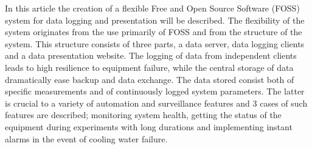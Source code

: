 In this article the creation of a flexible Free and Open Source
Software (FOSS) system for data logging and presentation will be
described. The flexibility of the system originates from the use
primarily of FOSS and from the structure of the system. This structure
consists of three parts, a data server, data logging clients and a
data presentation website. The logging of data from independent
clients leads to high resilience to equipment failure, while the
central storage of data dramatically ease backup and data
exchange. The data stored consist both of specific measurements and of
continuously logged system parameters. The latter is crucial to a
variety of automation and surveillance features and 3 cases of such
features are described; monitoring system health, getting the status of
the equipment during experiments with long durations and implementing
instant alarms in the event of cooling water failure.
